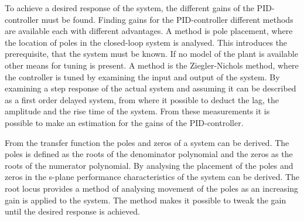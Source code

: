 \documentclass[../../main.tex]{subfiles}
\begin{document}

To achieve a desired response of the system, the different gains of the PID-controller must be found. Finding gains for the PID-controller different methods are available each with different advantages. A method is pole placement, where the location of poles in the closed-loop system is analysed. This introduces the prerequisite, that the system must be known. If no model of the plant is available other means for tuning is present. A method is the Ziegler-Nichols method, where the controller is tuned by examining the input and output of the system. By examining a step response of the actual system and assuming it can be described as a first order delayed system, from where it possible to deduct the lag, the amplitude and the rise time of the system. From these measurements it is possible to make an estimation for the gains of the PID-controller.

From the transfer function the poles and zeros of a system can be derived. The poles is defined as the roots of the denominator polynomial and the zeros as the roots of the numerator polynomial. By analysing the placement of the poles and zeros in the s-plane performance characteristics of the system can be derived. The root locus provides a method of analysing movement of the poles as an increasing gain is applied to the system. The method makes it possible to tweak the gain until the desired response is achieved.
\end{document}
